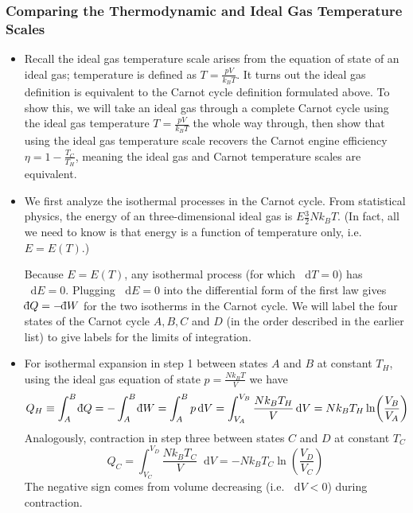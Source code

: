 \documentclass[11pt, a4paper]{article}
\newcommand{\diff}{\mathop{}\!\mathrm{d}} %
\newcommand{\dbar}{{\mathchar '26\mkern -11mu \mathrm{d}}} %
\begin{document}
\subsubsection{Comparing the Thermodynamic and Ideal Gas Temperature Scales}
\begin{itemize}
	\item Recall the ideal gas temperature scale arises from the equation of state of an ideal gas; temperature is defined as $ T = \frac{pV}{k_{B}T} $. It turns out the ideal gas definition is equivalent to the Carnot cycle definition formulated above. To show this, we will take an ideal gas through a complete Carnot cycle using the ideal gas temperature $ T = \frac{pV}{k_{B}T}  $ the whole way through, then show that using the ideal gas temperature scale recovers the Carnot engine efficiency $ \eta = 1 - \frac{T_{C}}{T_{H}} $, meaning the ideal gas and Carnot temperature scales are equivalent.
	
	\item We first analyze the isothermal processes in the Carnot cycle. From statistical physics, the energy of an three-dimensional ideal gas is $ E \frac{3}{2}N k_{B}T $. (In fact, all we need to know is that energy is a function of temperature only, i.e. $ E = E(T) $.)
	
	Because $ E = E(T) $, any isothermal process (for which $ \diff T = 0 $) has $ \diff E = 0 $. Plugging $ \diff E = 0 $ into the differential form of the first law gives $ \dbar Q = - \dbar W $ for the two isotherms in the Carnot cycle. We will label the four states of the Carnot cycle $ A, B, C $ and $ D $ (in the order described in the earlier list) to give labels for the limits of integration.
	
	\item For isothermal expansion in step 1 between states $ A $ and $ B $ at constant $ T_{H} $, using the ideal gas equation of state $ p =  \frac{Nk_{B}T}{V} $ we have
	\begin{equation*}
		Q_{H} \equiv \int_{A}^{B} \dbar Q = - \int_{A}^{B} \dbar W = \int_{A}^{B} p \diff V = \int_{V_{A}}^{V_{B}} \frac{Nk_{B}T_{H}}{V} \diff V = N k_{B} T_{H} \ln(\frac{V_{B}}{V_{A}})
	\end{equation*}
	Analogously, contraction in step three between states $ C $ and $ D $ at constant $ T_{C} $
	\begin{equation*}
		Q_{C} =  \int_{V_{C}}^{V_{D}} \frac{Nk_{B}T_{C}}{V} \diff V = - N k_{B} T_{C} \ln(\frac{V_{D}}{V_{C}})
	\end{equation*}
	The negative sign comes from volume decreasing (i.e. $ \diff V < 0 $) during contraction.
	

\end{itemize}
\end{document}

